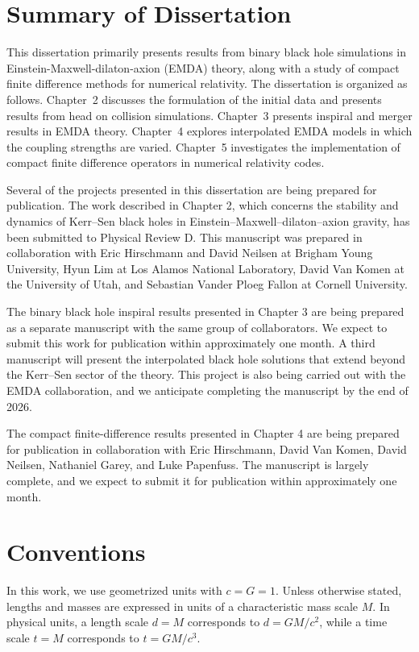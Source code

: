 \section{Summary of Dissertation}

This dissertation primarily presents results from binary black hole simulations in Einstein-Maxwell-dilaton-axion (EMDA) theory, along with a study of compact finite difference methods for numerical relativity. The dissertation is organized as follows. Chapter~2 discusses the formulation of the initial data and presents results from head on collision simulations. Chapter~3 presents inspiral and merger results in EMDA theory. Chapter~4 explores interpolated EMDA models in which the coupling strengths are varied. Chapter~5 investigates the implementation of compact finite difference operators in numerical relativity codes.

Several of the projects presented in this dissertation are being prepared for publication. The work described in Chapter 2, which concerns the stability and dynamics of Kerr–Sen black holes in Einstein–Maxwell–dilaton–axion gravity, has been submitted to Physical Review D. This manuscript was prepared in collaboration with Eric Hirschmann and David Neilsen at Brigham Young University, Hyun Lim at Los Alamos National Laboratory, David Van Komen at the University of Utah, and Sebastian Vander Ploeg Fallon at Cornell University.

The binary black hole inspiral results presented in Chapter 3 are being prepared as a separate manuscript with the same group of collaborators. We expect to submit this work for publication within approximately one month. A third manuscript will present the interpolated black hole solutions that extend beyond the Kerr–Sen sector of the theory. This project is also being carried out with the EMDA collaboration, and we anticipate completing the manuscript by the end of 2026.

The compact finite-difference results presented in Chapter 4 are being prepared for publication in collaboration with Eric Hirschmann, David Van Komen, David Neilsen, Nathaniel Garey, and Luke Papenfuss. The manuscript is largely complete, and we expect to submit it for publication within approximately one month.

\section{Conventions}

In this work, we use geometrized units with $c=G=1$. Unless otherwise stated, lengths and masses are expressed in units of a characteristic mass scale $M$. In physical units, a length scale $d=M$ corresponds to $d=GM/c^2$, while a time scale $t=M$ corresponds to $t=GM/c^3$.


